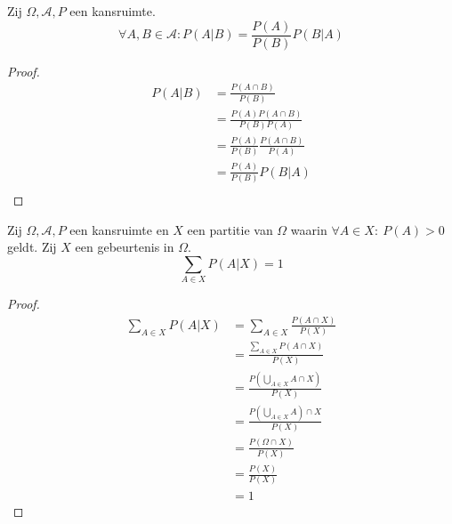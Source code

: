 \documentclass[main.tex]{subfiles}
\begin{document}
\begin{st}
  Zij $\Omega,\mathcal{A},P$ een kansruimte.
  \[
  \forall A,B \in \mathcal{A}: P(A|B) = \frac{P(A)}{P(B)}P(B|A)
  \]
  
  \begin{proof}
    \[
    \begin{array}{rl}
      P(A|B)
      &= \frac{P(A\cap B)}{P(B)}\\
      &= \frac{P(A)P(A\cap B)}{P(B)P(A)}\\
      &= \frac{P(A)}{P(B)}\frac{P(A\cap B)}{P(A)}\\
      &= \frac{P(A)}{P(B)}P(B|A)\\
    \end{array}
    \]
  \end{proof}
\end{st}

\begin{st}
  \label{st:rekenregel-afhankelijkheid-partitie}
  Zij $\Omega,\mathcal{A},P$ een kansruimte en $X$ een partitie van $\Omega$ waarin $\forall A \in X:\ P(A) > 0$ geldt.
  Zij $X$ een gebeurtenis in $\Omega$.
  \[ \sum_{A \in X}P(A|X) = 1 \]

  \begin{proof}
    \[
    \begin{array}{rl}
      \sum_{A \in X}P(A|X)
      &= \sum_{A \in X}\frac{P(A\cap X)}{P(X)}\\
      &= \frac{\sum_{A \in X}P(A \cap X)}{P(X)}\\
      &= \frac{P\left(\bigcup_{A \in X}A \cap X\right)}{P(X)}\\
      &= \frac{P\left(\bigcup_{A \in X}A\right) \cap X}{P(X)}\\
      &= \frac{P( \Omega \cap X)}{P(X)}\\
      &= \frac{P(X)}{P(X)}\\
      &= 1
    \end{array}
    \]
  \end{proof}
\end{st}
\end{document}
